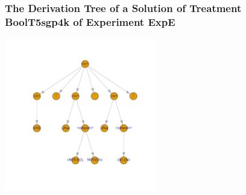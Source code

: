  \begin{frame}
 \frametitle{ The Derivation Tree of a Solution of Treatment BoolT5sgp4k of Experiment ExpE }
 \begin{center}
\includegraphics[width=0.5\textwidth, angle=0]
{ExpEDerivationTreeFigure007.pdf}
 \end{center}
 \label{report/ExpEDerivationTreeFigure007.pdf}  
 \end{frame}

